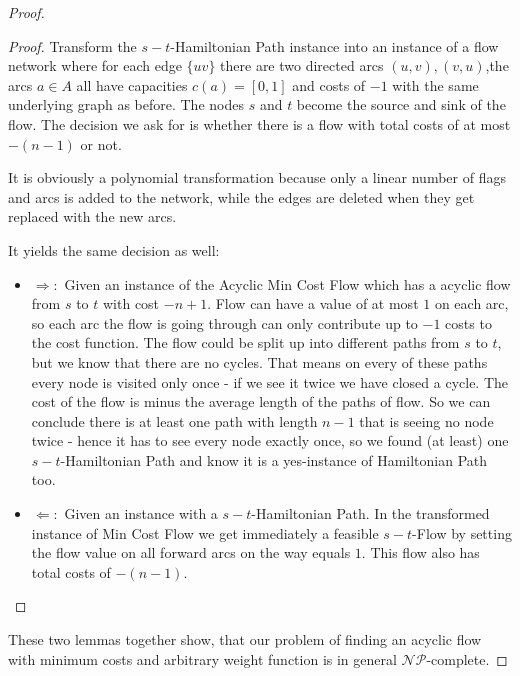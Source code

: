\begin{proof}
\begin{proof}
Transform the $s-t$-Hamiltonian Path instance into an instance of a flow network where for each edge $\{uv\}$ there 
are two directed arcs $(u,v),(v,u)$,the arcs $a\in A$ all have capacities $c(a)=[0,1]$ and costs of $-1$ 
with the same underlying graph as before. The nodes $s$ and $t$ become the source and sink of the flow.%
The decision we ask for is whether there is a flow with total costs of at most $-(n-1)$ or not.

It is obviously a polynomial transformation because only a linear number of flags and arcs is added to the network, 
while the edges are deleted when they get replaced with the new arcs.

It yields the same decision as well:
\begin{itemize}
 \item $\Rightarrow:$ Given an instance of the Acyclic Min Cost Flow which has a acyclic flow from $s$ to $t$ with cost 
$-n+1$.
Flow can have a value of at most $1$ on each arc, so each arc the flow is going through can only contribute up to $-1$ 
costs to the cost function. The flow could be split up into different paths from $s$ to $t$, but we know that there are 
no cycles. That means on every of these paths every node is visited only once - if we see it twice we have closed a 
cycle. The cost of the flow is minus the average length of the paths of flow. So we can conclude there is at least one 
path with length $n-1$ that is seeing no node twice - hence it has to see every node exactly once, so we found (at 
least) one $s-t$-Hamiltonian Path and know it is a yes-instance of Hamiltonian Path too.

\item $\Leftarrow:$ Given an instance with a $s-t$-Hamiltonian Path. In the transformed instance of Min Cost Flow we 
get immediately a feasible $s-t$-Flow by setting the flow value on all forward arcs on the way equals $1$. This flow 
also has total costs of $-(n-1)$.
\end{itemize}
\end{proof}

These two lemmas together show, that our problem of finding an acyclic flow with minimum costs and arbitrary weight 
function is in general $\mathcal{NP}$-complete.
\end{proof}
